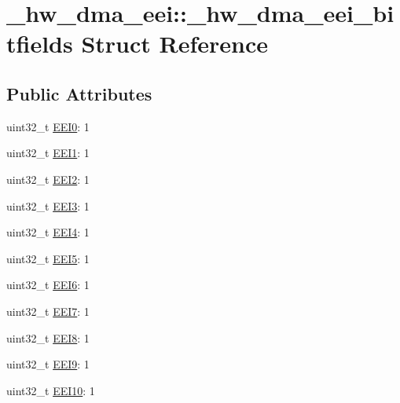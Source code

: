 \hypertarget{struct__hw__dma__eei_1_1__hw__dma__eei__bitfields}{}\section{\+\_\+hw\+\_\+dma\+\_\+eei\+:\+:\+\_\+hw\+\_\+dma\+\_\+eei\+\_\+bitfields Struct Reference}
\label{struct__hw__dma__eei_1_1__hw__dma__eei__bitfields}
\subsection*{Public Attributes}
\begin{DoxyCompactItemize}
\item 
uint32\+\_\+t \hyperlink{struct__hw__dma__eei_1_1__hw__dma__eei__bitfields_a9f7024f915c3e22df5d9606c1d901620}{E\+E\+I0}\+: 1
\item 
uint32\+\_\+t \hyperlink{struct__hw__dma__eei_1_1__hw__dma__eei__bitfields_ade6c9f6bb514437fb510adbe734a2b12}{E\+E\+I1}\+: 1
\item 
uint32\+\_\+t \hyperlink{struct__hw__dma__eei_1_1__hw__dma__eei__bitfields_aac62c4e77ff25a66d0880c6786624d6b}{E\+E\+I2}\+: 1
\item 
uint32\+\_\+t \hyperlink{struct__hw__dma__eei_1_1__hw__dma__eei__bitfields_ad670d39bf107d248c0145c0a31c5af7b}{E\+E\+I3}\+: 1
\item 
uint32\+\_\+t \hyperlink{struct__hw__dma__eei_1_1__hw__dma__eei__bitfields_a99c4fe49f695fbeee87236cf3ab7713c}{E\+E\+I4}\+: 1
\item 
uint32\+\_\+t \hyperlink{struct__hw__dma__eei_1_1__hw__dma__eei__bitfields_a19d1148191817c85ae7c2bd34851d266}{E\+E\+I5}\+: 1
\item 
uint32\+\_\+t \hyperlink{struct__hw__dma__eei_1_1__hw__dma__eei__bitfields_a32d37a5b345f152640fb80fee020efee}{E\+E\+I6}\+: 1
\item 
uint32\+\_\+t \hyperlink{struct__hw__dma__eei_1_1__hw__dma__eei__bitfields_aa1febdb0dc8b6c3ba842c53826694999}{E\+E\+I7}\+: 1
\item 
uint32\+\_\+t \hyperlink{struct__hw__dma__eei_1_1__hw__dma__eei__bitfields_a3112ec35ef9f61b062e889381ee35e22}{E\+E\+I8}\+: 1
\item 
uint32\+\_\+t \hyperlink{struct__hw__dma__eei_1_1__hw__dma__eei__bitfields_ab02e0bffb8982a98be92b28df71bd1e9}{E\+E\+I9}\+: 1
\item 
uint32\+\_\+t \hyperlink{struct__hw__dma__eei_1_1__hw__dma__eei__bitfields_a9368d5956f2d6cd251d0084b3574ae1d}{E\+E\+I10}\+: 1

\end{DoxyCompactItemize}

